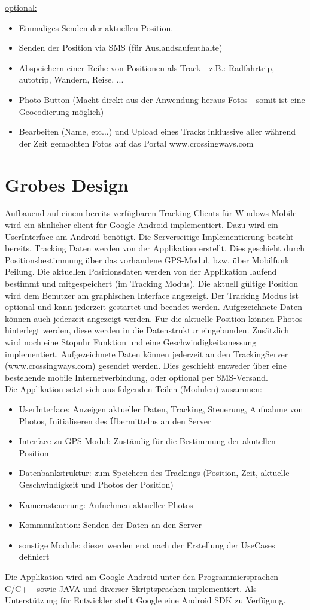\documentclass[a4paper,10pt]{article}
\begin{document}
\underline{optional:}
\begin{itemize}
\item Einmaliges Senden der aktuellen Position.
\item Senden der Position via SMS (für Auslandsaufenthalte)
\item Abspeichern einer Reihe von Positionen als Track - z.B.: Radfahrtrip, autotrip, Wandern, Reise, ...
\item Photo Button (Macht direkt aus der Anwendung heraus Fotos - somit ist eine Geocodierung möglich)
\item Bearbeiten (Name, etc...) und Upload eines Tracks inklussive aller  während der Zeit gemachten Fotos auf das Portal www.crossingways.com
\end{itemize}

\section{Grobes Design}
Aufbauend auf einem bereits verfügbaren Tracking Clients für Windows Mobile wird ein ähnlicher client für
Google Android implementiert. Dazu wird ein UserInterface am Android benötigt. Die Serverseitige Implementierung
besteht bereits. Tracking Daten werden von der Applikation erstellt. Dies geschieht durch Positionsbestimmung über
das vorhandene GPS-Modul, bzw. über Mobilfunk Peilung. Die aktuellen Positionsdaten werden von der Applikation laufend
bestimmt und mitgespeichert (im Tracking Modus). Die aktuell gültige Position wird dem Benutzer am graphischen Interface
angezeigt. Der Tracking Modus ist optional und kann jederzeit gestartet und beendet werden. Aufgezeichnete Daten können auch
jederzeit angezeigt werden. Für die aktuelle Position können Photos hinterlegt werden, diese werden in die Datenstruktur
eingebunden. Zusätzlich wird noch eine Stopuhr Funktion und eine Geschwindigkeitsmessung implementiert. Aufgezeichnete
Daten können jederzeit an den TrackingServer (www.crossingways.com) gesendet werden. Dies geschieht entweder über eine
bestehende mobile Internetverbindung, oder optional per SMS-Versand.\\
Die Applikation setzt sich aus folgenden Teilen (Modulen) zusammen:
\begin{itemize}
 \item UserInterface: Anzeigen aktueller Daten, Tracking, Steuerung, Aufnahme von Photos, Initialiseren des Übermittelns
an den Server
 \item Interface zu GPS-Modul: Zuständig für die Bestimmung der akutellen Position
 \item Datenbankstruktur: zum Speichern des Trackings (Position, Zeit, aktuelle Geschwindigkeit und Photos der Position)
 \item Kamerasteuerung: Aufnehmen aktueller Photos
 \item Kommunikation: Senden der Daten an den Server
 \item sonstige Module: dieser werden erst nach der Erstellung der UseCases definiert
\end{itemize}
Die Applikation wird am Google Android unter den Programmiersprachen C/C++ sowie JAVA und diverser Skriptsprachen
implementiert. Als Unterstützung für Entwickler stellt Google eine Android SDK zu Verfügung.
\end{document}
